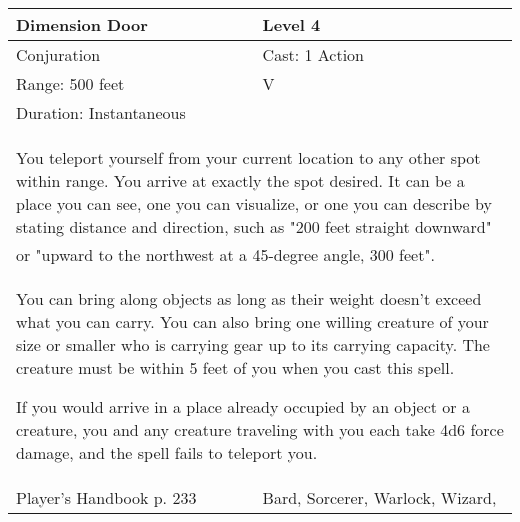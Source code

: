\documentclass[11pt]{report}
\begin{document}
\begin{table}[H]
	\begin{tabular}{||p{6cm}|p{6cm}||}
		\hline\hline
		\bf{Dimension Door} & Level 4\\ \hline
		Conjuration & Cast: 1 Action\\ \hline
		Range: 500 feet & V\\ \hline
		Duration: Instantaneous & \\ \hline
		\multicolumn{2}{||p{12cm}||}{You teleport yourself from your current location to any other spot within range. You arrive at exactly the spot desired. It can be a place you can see, one you can visualize, or one you can describe by stating distance and direction, such as "200 feet straight downward" or "upward to the northwest at a 45-degree angle, 300 feet". 

You can bring along objects as long as their weight doesn’t exceed what you can carry. You can also bring one willing creature of your size or smaller who is carrying gear up to its carrying capacity. The creature must be within 5 feet of you when you cast this spell. 

If you would arrive in a place already occupied by an object or a creature, you and any creature traveling with you each take 4d6 force damage, and the spell fails to teleport you.}\\ \hline
Player's Handbook p. 233 & Bard, Sorcerer, Warlock, Wizard, \\ \hline\hline
	\end{tabular}
\end{table}
\end{document}
